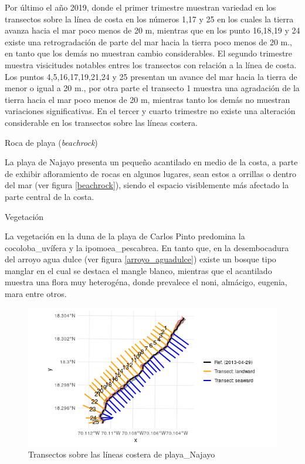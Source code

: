 \documentclass[11pt,]{article}
\begin{document}
Por último el año 2019, donde el primer trimestre muestran variedad en
los transectos sobre la línea de costa en los números 1,17 y 25 en los
cuales la tierra avanza hacia el mar poco menos de 20 m, mientras que en
los punto 16,18,19 y 24 existe una retrogradación de parte del mar hacia
la tierra poco menos de 20 m., en tanto que los demás no muestran cambio
considerables. El segundo trimestre muestra visicitudes notables entres
los transectos con relación a la línea de costa. Los puntos
4,5,16,17,19,21,24 y 25 presentan un avance del mar hacia la tierra de
menor o igual a 20 m., por otra parte el transecto 1 muestra una
agradación de la tierra hacia el mar poco menos de 20 m, mientras tanto
los demás no muestran variaciones significativas. En el tercer y cuarto
trimestre no existe una alteración considerable en los transectos sobre
las líneas costera.

Roca de playa (\emph{beachrock})

La playa de Najayo presenta un pequeño acantilado en medio de la costa,
a parte de exhibir afloramiento de rocas en algunos lugares, sean estos
a orrillas o dentro del mar (ver figura \ref{beachrock}), siendo el
espacio visiblemente más afectado la parte central de la costa.

Vegetación

La vegetación en la duna de la playa de Carlos Pinto predomina la
cocoloba\_uvífera y la ipomoea\_pescabrea. En tanto que, en la
desembocadura del arroyo agua dulce (ver figura \ref{arroyo_aguadulce})
existe un bosque tipo manglar en el cual se destaca el mangle blanco,
mientras que el acantilado muestra una flora muy heterogéna, donde
prevalece el noni, almácigo, eugenia, mara entre otros.

\begin{figure}
\centering
\includegraphics{transect_linea_R.png}
\caption{Transectos sobre las líneas costera de
playa\_Najayo\label{transect_linea}}
\end{figure}
\end{document}
